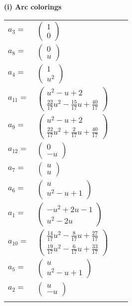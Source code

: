 \documentclass[1p]{elsarticle_modified}
\theoremstyle{definition}
\begin{document}
\flushleft \textbf{(i) Arc colorings}\\
\begin{tabular}{m{7pt} m{180pt} m{7pt} m{180pt} }
\flushright $a_{3}=$&$\begin{pmatrix}1\\0\end{pmatrix}$ \\
\flushright $a_{8}=$&$\begin{pmatrix}0\\u\end{pmatrix}$ \\
\flushright $a_{4}=$&$\begin{pmatrix}1\\u^2\end{pmatrix}$ \\
\flushright $a_{11}=$&$\begin{pmatrix}u^2- u+2\\\frac{22}{17} u^2-\frac{15}{17} u+\frac{40}{17}\end{pmatrix}$ \\
\flushright $a_{9}=$&$\begin{pmatrix}u^2- u+2\\\frac{22}{17} u^2+\frac{2}{17} u+\frac{40}{17}\end{pmatrix}$ \\
\flushright $a_{12}=$&$\begin{pmatrix}0\\- u\end{pmatrix}$ \\
\flushright $a_{7}=$&$\begin{pmatrix}u\\u\end{pmatrix}$ \\
\flushright $a_{6}=$&$\begin{pmatrix}u\\u^2- u+1\end{pmatrix}$ \\
\flushright $a_{1}=$&$\begin{pmatrix}- u^2+2 u-1\\u^2-2 u\end{pmatrix}$ \\
\flushright $a_{10}=$&$\begin{pmatrix}\frac{14}{17} u^2-\frac{8}{17} u+\frac{27}{17}\\\frac{19}{17} u^2-\frac{6}{17} u+\frac{33}{17}\end{pmatrix}$ \\
\flushright $a_{5}=$&$\begin{pmatrix}u\\u^2- u+1\end{pmatrix}$ \\
\flushright $a_{2}=$&$\begin{pmatrix}u\\- u\end{pmatrix}$\\&\end{tabular}
\end{document}
